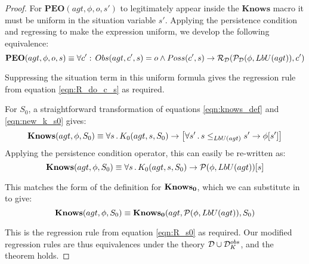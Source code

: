 \begin{proof}
For $\mathbf{PEO}(agt,\phi,o,s')$ to legitimately appear inside the
$\mathbf{Knows}$ macro it must be uniform in the situation variable
$s'$. Applying the persistence condition and regressing to make the
expression uniform, we develop the following equivalence:\[
\mathbf{PEO}(agt,\phi,o,s)\equiv\forall c':\, Obs(agt,c',s)=o\wedge Poss(c',s)\rightarrow\mathcal{R}_{\mathcal{D}}(\mathcal{P}_{\mathcal{D}}(\phi,LbU(agt)),c')\]
 

Suppressing the situation term in this uniform formula gives the regression
rule from equation \eqref{eqn:R_do_c_s} as required.

For $S_{0}$, a straightforward transformation of equations \eqref{eqn:knows_def}
and \eqref{eqn:new_k_s0} gives:\[
\mathbf{Knows}(agt,\phi,S_{0})\equiv\forall s\,.\, K_{0}(agt,s,S_{0})\rightarrow\left[\forall s'\,.\, s\leq_{LbU(agt)}s'\rightarrow\phi[s']\right]\]
 Applying the persistence condition operator, this can easily be re-written
as:\[
\mathbf{Knows}(agt,\phi,S_{0})\equiv\forall s\,.\, K_{0}(agt,s,S_{0})\rightarrow\mathcal{P}(\phi,LbU(agt))[s]\]


This matches the form of the definition for $\mathbf{Knows_{0}}$, which we can
substitute in to give:\[
\mathbf{Knows}(agt,\phi,S_{0})\equiv\mathbf{Knows_{0}}(agt,\mathcal{P}(\phi,LbU(agt)),S_{0})\]


This is the regression rule from equation \eqref{eqn:R_s0} as required.
Our modified regression rules are thus equivalences under the theory
$\mathcal{D}\cup\mathcal{D}_{K}^{obs}$, and the theorem holds.
\end{proof}
\medskip{}
\newpage{}


